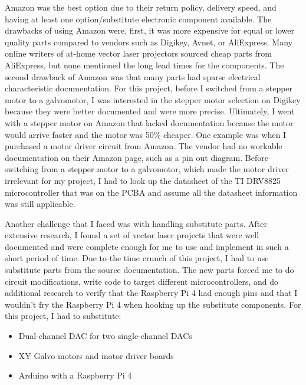 \documentclass[journal]{IEEEtran}
\begin{document}
    Amazon was the best option due to their return policy, delivery speed, and having at least one option/substitute electronic component available.
    The drawbacks of using Amazon were, first, it was more expensive for equal or lower quality parts compared to vendors such as Digikey, Avnet, or AliExpress.
    Many online writers of at-home vector laser projectors sourced cheap parts from AliExpress, but none mentioned the long lead times for the components.
    The second drawback of Amazon was that many parts had sparse electrical characteristic documentation.
    For this project, before I switched from a stepper motor to a galvomotor, I was interested in the stepper motor selection on Digikey because they were better documented and were more precise. 
    Ultimately, I went with a stepper motor on Amazon that lacked documentation because the motor would arrive faster and the motor was 50\% cheaper. 
    One example was when I purchased a motor driver circuit from Amazon.
    The vendor had no workable documentation on their Amazon page, such as a pin out diagram.
    Before switching from a stepper motor to a galvomotor, which made the motor driver irrelevant for my project, I had to look up the datasheet of the TI DRV8825 microcontroller that was on the PCBA and assume all the datasheet information was still applicable.

    Another challenge that I faced was with handling substitute parts. 
    After extensive research, I found a set of vector laser projects that were well documented and were complete enough for me to use and implement in such a short period of time.
    Due to the time crunch of this project, I had to use substitute parts from the source documentation.
    The new parts forced me to do circuit modifications, write code to target different microcontrollers, and do additional research to verify that the Raspberry Pi 4 had enough pins and that I wouldn't fry the Raspberry Pi 4 when hooking up the substitute components.
    For this project, I had to substitute:
    \begin{itemize}
        \item Dual-channel DAC for two single-channel DACs
        \item XY Galvo-motors and motor driver boards
        \item Arduino with a Raspberry Pi 4
    \end{itemize} 
\end{document}
